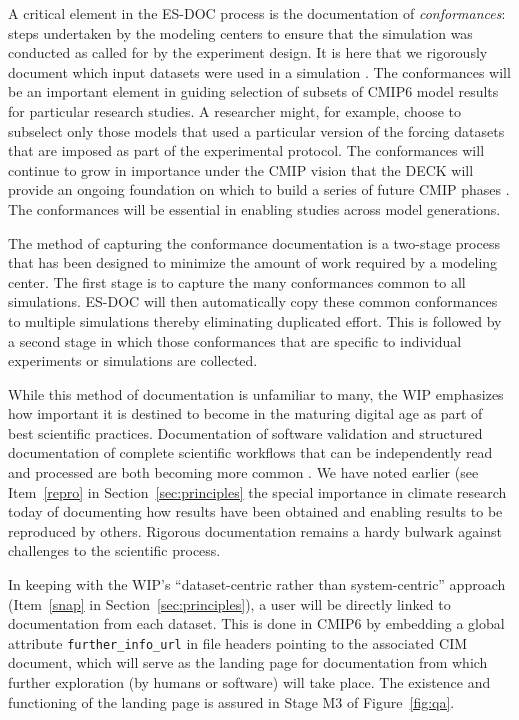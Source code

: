 \documentclass[gmd,manuscript]{copernicus}
\begin{document}
A critical element in the ES-DOC process is the documentation of
\emph{conformances}: steps undertaken by the modeling centers to
ensure that the simulation was conducted as called for by the
experiment design. It is here that we rigorously document which input
datasets were used in a simulation \citep[e.g., the version of each of
the forcing datasets, see][]{ref:duracketal2017}. The conformances
will be an important element in guiding selection of subsets of CMIP6
model results for particular research studies. A researcher might, for
example, choose to subselect only those models that used a particular
version of the forcing datasets that are imposed as part of the
experimental protocol. The conformances will continue to grow in
importance under the CMIP vision that the DECK will provide an ongoing
foundation on which to build a series of future CMIP phases
\citep[shown schematically in Figure~1 of][]{ref:eyringetal2016a}. The
conformances will be essential in enabling studies across model
generations.

The method of capturing the conformance documentation is a two-stage
process that has been designed to minimize the amount of work required
by a modeling center. The first stage is to capture the many
conformances common to all simulations. ES-DOC will then automatically
copy these common conformances to multiple simulations thereby
eliminating duplicated effort. This is followed by a second stage in
which those conformances that are specific to individual experiments
or simulations are collected.

While this method of documentation is unfamiliar to many, the WIP
emphasizes how important it is destined to become in the maturing
digital age as part of best scientific practices. Documentation of
software validation \citep[see e.g][]{ref:peng2011} and structured
documentation of complete scientific workflows that can be
independently read and processed are both becoming more common
\citep[see the special issue on the ``Geoscience Paper of the
Future'', ][]{ref:davidetal2016}. We have noted earlier (see
Item~\ref{repro} in Section~\ref{sec:principles} the special importance in
climate research today of documenting how results have been obtained
and enabling results to be reproduced by others. Rigorous
documentation remains a hardy bulwark against challenges to the
scientific process.

In keeping with the WIP's ``dataset-centric rather than
system-centric'' approach (Item~\ref{snap} in Section~\ref{sec:principles}), a
user will be directly linked to documentation from each dataset. This
is done in CMIP6 by embedding a global attribute
\texttt{further\_info\_url} in file headers pointing to the associated
CIM document, which will serve as the landing page for documentation
from which further exploration (by humans or software) will take
place. The existence and functioning of the landing page is assured in
Stage M3 of Figure~\ref{fig:qa}.
\end{document}
